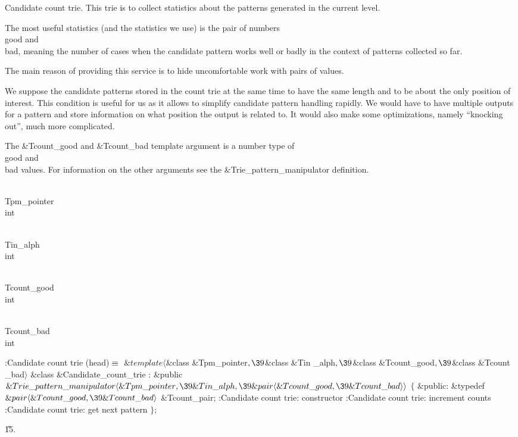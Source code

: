 Candidate count trie. This trie is to collect statistics about the
patterns generated in the current level.

The most useful statistics (and the statistics we use) is the pair of
numbers \\{good} and \\{bad}, meaning the number of cases when the candidate
pattern works well or badly in the context of patterns collected so far.

The main reason of providing this service is to hide uncomfortable work
with pairs of values.

We suppose the candidate patterns stored in the count trie at the same
time to have the same length and to be about the only position of
interest. This condition is useful for us as it allows to simplify
candidate pattern handling rapidly. We would have to have multiple
outputs for a pattern and store information on what position the output
is related to. It would also make some optimizations, namely ``knocking
out'', much more complicated.

The \&{Tcount\_good} and \&{Tcount\_bad} template argument is a number type of
\\{good} and \\{bad} values. For information on the other arguments see the
\&{Trie\_pattern\_manipulator} definition.

\Y\B\F\\{Tpm\_pointer} \5
\\{int}\par
\B\F\\{Tin\_alph} \5
\\{int}\par
\B\F\\{Tcount\_good} \5
\\{int}\par
\B\F\\{Tcount\_bad} \5
\\{int}\par
\Y\B\4:Candidate count trie (head)\X${}\equiv{}$\6
$\&{template}\langle{}$\&{class} \&{Tpm\_pointer}${},\39{}$\&{class} \&{Tin%
\_alph}${},\39{}$\&{class} \&{Tcount\_good}${},\39{}$\&{class} \&{Tcount%
\_bad}${}\rangle{}$\6
\&{class} \&{Candidate\_count\_trie} :\6
\&{public} ${}\&{Trie\_pattern\_manipulator}\langle\&{Tpm\_pointer},\39\&{Tin%
\_alph},\39\&{pair}\langle\&{Tcount\_good},\39\&{Tcount\_bad}\rangle\rangle{}$
${}\{{}$\1\6
\4\&{public}:\6
\&{typedef} ${}\&{pair}\langle\&{Tcount\_good},\39\&{Tcount\_bad}\rangle{}$ %
\&{Tcount\_pair};\7
:Candidate count trie: constructor\X\6
:Candidate count trie: increment counts\X\6
:Candidate count trie: get next pattern\X\2\6
${}\}{}$;\par
\U15.\fi

